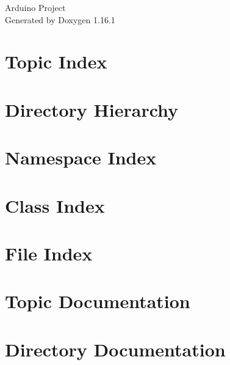 \documentclass[twoside]{book}
\newcommand{\+}{\discretionary{\mbox{\scriptsize$\hookleftarrow$}}{}{}}
\newcommand{\clearemptydoublepage}{%
    \newpage{\pagestyle{empty}\cleardoublepage}%
  }
\begin{document}
  \raggedbottom
    \hypersetup{pageanchor=false,
                bookmarksnumbered=true,
                pdfencoding=unicode
               }
  \begin{titlepage}
  \vspace*{7cm}
  \begin{center}%
  {\Large Arduino Project}\\
  \vspace*{1cm}
  {\large Generated by Doxygen 1.16.1}\\
  \end{center}
  \end{titlepage}
  \clearemptydoublepage
  \tableofcontents
  \clearemptydoublepage
  \hypersetup{pageanchor=true}
\chapter{Topic Index}

\chapter{Directory Hierarchy}

\chapter{Namespace Index}

\chapter{Class Index}

\chapter{File Index}

\chapter{Topic Documentation}




\chapter{Directory Documentation}









\end{document}
